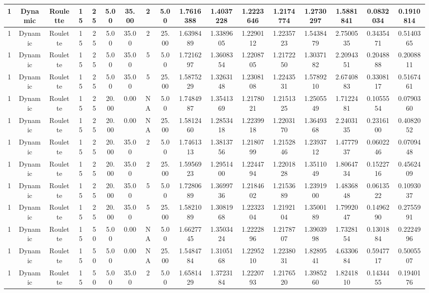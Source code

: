 \documentclass[a4paper]{article}
\begin{document}
\begin{center}
\begin{tabular}{ | c | c | c | c | c | c | c | c | c | c | c | c | c | c | c | c | c | }
		\hline
		1	&	Dynamic	&	Roulette	&	15	&	25	&	5.00	&	35.00	&	2	&	5.00	&	1.7616388	&	1.4037228	&	1.2223646	&	1.2174774	&	1.2730297	&	1.5881841	&	0.0832034	&	0.1910814 \\
		\hline
		1	&	Dynamic	&	Roulette	&	15	&	25	&	5.00	&	35.00	&	2	&	25.00	&	1.6398489	&	1.3389605	&	1.2290112	&	1.2235723	&	1.5438479	&	2.7500535	&	0.3435471	&	0.5140365 \\
		\hline
		1	&	Dynamic	&	Roulette	&	15	&	25	&	5.00	&	35.00	&	5	&	5.00	&	1.7216297	&	1.3608354	&	1.2208705	&	1.2172250	&	1.3037182	&	2.2094351	&	0.2048888	&	0.2008811 \\
		\hline
		1	&	Dynamic	&	Roulette	&	15	&	25	&	5.00	&	35.00	&	5	&	25.00	&	1.5875229	&	1.3263148	&	1.2308108	&	1.2243531	&	1.5789210	&	2.6740883	&	0.3308117	&	0.5167461 \\
		\hline
		1	&	Dynamic	&	Roulette	&	15	&	25	&	20.00	&	0.00	&	NA	&	5.00	&	1.7484987	&	1.3541369	&	1.2178021	&	1.2151325	&	1.2505549	&	1.7122481	&	0.1055554	&	0.0790360 \\
		\hline
		1	&	Dynamic	&	Roulette	&	15	&	25	&	20.00	&	0.00	&	NA	&	25.00	&	1.5812460	&	1.2853418	&	1.2239918	&	1.2203170	&	1.3649368	&	2.2403135	&	0.2316100	&	0.4082052 \\
		\hline
		1	&	Dynamic	&	Roulette	&	15	&	25	&	20.00	&	35.00	&	2	&	5.00	&	1.7461313	&	1.3813756	&	1.2180799	&	1.2152846	&	1.2393712	&	1.4777937	&	0.0602246	&	0.0709448 \\
		\hline
		1	&	Dynamic	&	Roulette	&	15	&	25	&	20.00	&	35.00	&	2	&	25.00	&	1.5956923	&	1.2951400	&	1.2244794	&	1.2201828	&	1.3511049	&	1.8064734	&	0.1522716	&	0.4562409 \\
		\hline
		1	&	Dynamic	&	Roulette	&	15	&	25	&	20.00	&	35.00	&	5	&	5.00	&	1.7280689	&	1.3699736	&	1.2184602	&	1.2153689	&	1.2391900	&	1.4836848	&	0.0613522	&	0.1093037 \\
		\hline
		1	&	Dynamic	&	Roulette	&	15	&	25	&	20.00	&	35.00	&	5	&	25.00	&	1.5821089	&	1.3081968	&	1.2232304	&	1.2192104	&	1.3500189	&	1.7992047	&	0.1496290	&	0.2755991 \\
		\hline
		1	&	Dynamic	&	Roulette	&	15	&	50	&	5.00	&	0.00	&	NA	&	5.00	&	1.6627745	&	1.3503424	&	1.2222896	&	1.2178707	&	1.3903998	&	1.7328154	&	0.1301884	&	0.2224996 \\
		\hline
		1	&	Dynamic	&	Roulette	&	15	&	50	&	5.00	&	0.00	&	NA	&	25.00	&	1.5484784	&	1.3105168	&	1.2295210	&	1.2238031	&	1.8289541	&	4.6330684	&	0.5947717	&	0.5005507 \\
		\hline
		1	&	Dynamic	&	Roulette	&	15	&	50	&	5.00	&	35.00	&	2	&	5.00	&	1.6581429	&	1.3723184	&	1.2220793	&	1.2176520	&	1.3985260	&	1.8241810	&	0.1434455	&	0.1940176 \\

\end{tabular}
\end{center}
\end{document}
